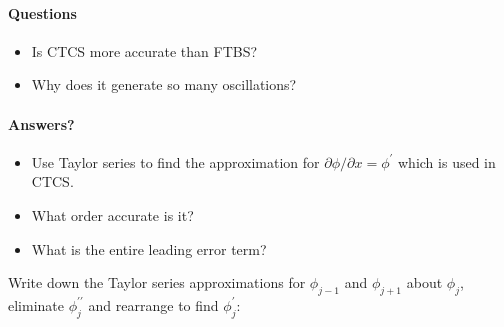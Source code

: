 \paragraph*{Questions}
\begin{itemize}
\item Is CTCS more accurate than FTBS?
\item Why does it generate so many oscillations?
\end{itemize}

\paragraph*{Answers?}
\begin{itemize}
\item Use Taylor series to find the approximation for $\partial\phi/\partial x=\phi^{\prime}$
which is used in CTCS. 
\item What order accurate is it?
\item What is the entire leading error term?
\end{itemize}
\clearpage{}

Write down the Taylor series approximations for $\phi_{j-1}$ and
$\phi_{j+1}$ about $\phi_{j}$, eliminate $\phi_{j}^{\prime\prime}$
and rearrange to find $\phi_{j}^{\prime}$:\pause


